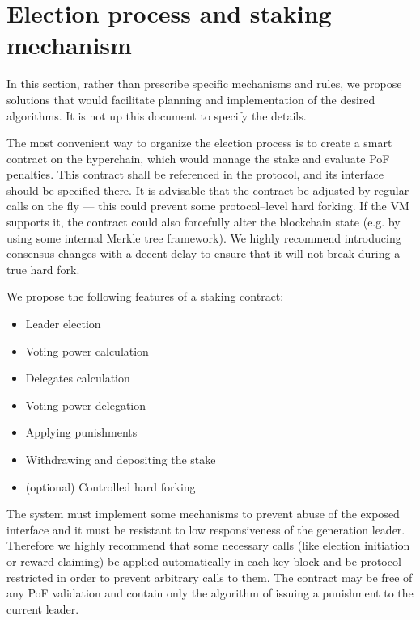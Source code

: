 \section{Election process and staking mechanism}

In this section, rather than prescribe specific mechanisms and rules, we propose
solutions that would facilitate planning and implementation of the desired
algorithms. It is not up this document to specify the details.

The most convenient way to organize the election process is to create a smart
contract on the hyperchain, which would manage the stake and evaluate PoF
penalties. This contract shall be referenced in the protocol, and its interface
should be specified there. It is advisable that the contract be adjusted by
regular calls on the fly --- this could prevent some protocol–level hard
forking. If the VM supports it, the contract could also forcefully alter the
blockchain state (e.g. by using some internal Merkle tree framework). We highly
recommend introducing consensus changes with a decent delay to ensure that it
will not break during a true hard fork.

We propose the following features of a staking contract:

\begin{itemize}
\item Leader election
\item Voting power calculation
\item Delegates calculation
\item Voting power delegation
\item Applying punishments
\item Withdrawing and depositing the stake
\item (optional) Controlled hard forking
\end{itemize}

The system must implement some mechanisms to prevent abuse of the exposed
interface and it must be resistant to low responsiveness of the generation
leader. Therefore we highly recommend that some necessary calls (like election
initiation or reward claiming) be applied automatically in each key block and be
protocol–restricted in order to prevent arbitrary calls to them. The contract
may be free of any PoF validation and contain only the algorithm of issuing a
punishment to the current leader.
